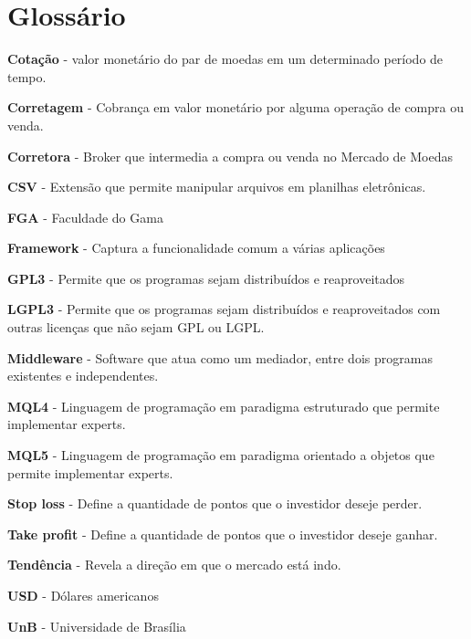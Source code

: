 \chapter{Glossário}

\textbf{Cotação} - valor monetário do par de moedas em um determinado período de tempo.

\textbf{Corretagem} - Cobrança em valor monetário por alguma operação de compra ou venda.

\textbf{Corretora} - Broker que intermedia a compra ou venda no Mercado de Moedas

\textbf{CSV} - Extensão que permite manipular arquivos em planilhas eletrônicas.

\textbf{FGA} - Faculdade do Gama

\textbf{Framework} - Captura a funcionalidade comum a várias aplicações

\textbf{GPL3} - Permite que os programas sejam distribuídos e reaproveitados

\textbf{LGPL3} -  Permite que os programas sejam distribuídos e reaproveitados com outras licenças que não sejam GPL ou LGPL.

\textbf{Middleware} - Software que atua como um mediador, entre dois programas existentes e independentes.

\textbf{MQL4} - Linguagem de programação em paradigma estruturado que permite implementar experts.

\textbf{MQL5 }- Linguagem de programação em paradigma orientado a objetos que permite implementar experts.

\textbf{Stop loss} - Define a quantidade de pontos que o investidor deseje perder.

\textbf{Take profit} - Define a quantidade de pontos que o investidor deseje ganhar.

\textbf{Tendência} - Revela a direção em que o mercado está indo.

\textbf{USD} - Dólares americanos

\textbf{UnB} - Universidade de Brasília
